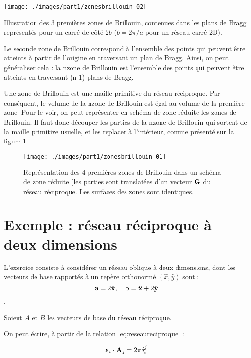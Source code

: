 \begin{marginfigure}
    \texttt{[image: ./images/part1/zonesbrillouin-02]}
    \caption{Illustration des 3 premières zones de Brillouin, contenues dans les plans de Bragg représentés pour un carré de côté $2b$ ($b=2\pi/a$ pour un réseau carré 2D).}
    \label{fig:constructionbrillouin}
\end{marginfigure}
Le seconde zone de Brillouin correspond à l'ensemble des points qui peuvent être atteints à partir de l'origine en traversant un plan de Bragg. Ainsi, on peut généraliser cela :
la n\ieme zone de Brillouin est l'ensemble des points qui peuvent être atteints en traversant (n-1) plans de Bragg.

Une zone de Brillouin est une maille primitive du réseau réciproque. Par conséquent, le volume de la n\ieme zone de Brillouin est égal au volume de la première zone. Pour le voir, on peut représenter en schéma de zone réduite les zones de Brillouin. Il faut donc découper les parties de la n\ieme zone de Brillouin qui sortent de la maille primitive usuelle, et les replacer à l'intérieur, comme présenté sur la figure \ref{fig:brillouinreduite}.

\begin{figure}
    \texttt{[image: ./images/part1/zonesbrillouin-01]}
    \caption{Représentation des 4 premières zones de Brillouin dans un schéma de zone réduite (les parties sont translatées d'un vecteur $\mathbf{G}$ du réseau réciproque. Les surfaces des zones sont identiques.}
    \label{fig:brillouinreduite}
\end{figure}

\section{Exemple : réseau réciproque à deux dimensions}

L'exercice consiste à considérer un réseau oblique à deux dimensions, dont les vecteurs de base rapportés à un repère orthonormé $(\hat{x},\hat{y})$ sont :
\begin{equation}
\mathbf{a} = 2\mathbf{\hat{x}},\quad \mathbf{b} = \mathbf{\hat{x}}+2\mathbf{\hat{y}}
\end{equation}.

Soient $A$ et $B$ les vecteurs de base du réseau réciproque.

On peut écrire, à partir de la relation \ref{eq:reseaureciproque} :

\begin{equation}
\mathbf{a}_i \cdot \mathbf{A}_j = 2\pi \delta_i^j
\end{equation}

